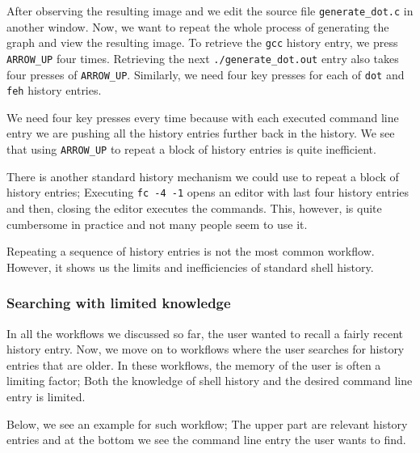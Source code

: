 \documentclass[thesis=M,english]{FITthesis}[2012/10/20]
\newcommand{\redtext}[1]{\textcolor{red}{[[#1]]}}
\begin{document}
After observing the resulting image and we edit the source file \verb|generate_dot.c| in another window.
Now, we want to repeat the whole process of generating the graph and view the resulting image. To retrieve the \verb|gcc| history entry, we press \verb|ARROW_UP| four times. Retrieving the next \verb|./generate_dot.out| entry also takes four presses of \verb|ARROW_UP|. Similarly, we need four key presses for each of \verb|dot| and \verb|feh| history entries. 

We need four key presses every time because with each executed command line entry we are pushing all the history entries further back in the history. We see that using \verb|ARROW_UP| to repeat a block of history entries is quite inefficient.  

There is another standard history mechanism we could use to repeat a block of history entries; 
Executing \verb|fc -4 -1| opens an editor with last four history entries and then, closing the editor executes the commands.  This, however, is quite cumbersome in practice and not many people seem to use it. %

Repeating a sequence of history entries is not the most common workflow. However, it shows us the limits and inefficiencies of standard shell history.


\subsubsection*{Searching with limited knowledge}

In all the workflows we discussed so far, the user wanted to recall a fairly recent history entry. Now, we move on to workflows where the user searches for history entries that are older. In these workflows, the memory of the user is often a limiting factor; Both the knowledge of shell history and the desired command line entry is limited.

Below, we see an example for such workflow; The upper part are relevant history entries and at the bottom we see the command line entry the user wants to find. 

\end{document}

